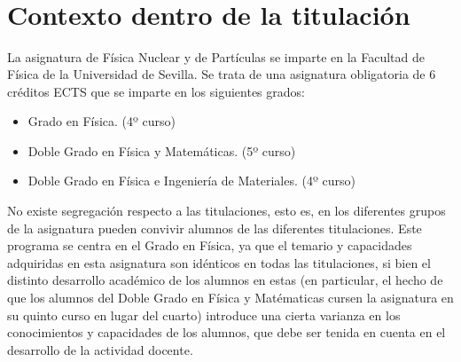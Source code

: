 \documentclass[a4paper,12pt,twoside]{article}
\begin{document}
~ \\

~ \\


\newpage

~ \\
%
%
\newpage

\tableofcontents
\newpage

~ \\




\section{Contexto dentro de la titulación}
\label{intro}

La asignatura de F\'isica Nuclear y de Part\'iculas se imparte en la Facultad de F\'isica de la Universidad de Sevilla. Se trata de una asignatura obligatoria de 6 cr\'editos ECTS que se imparte en los siguientes grados:
\begin{itemize}
\item Grado en F\'isica. (4º curso)
\item Doble Grado en Física y Matemáticas. (5º curso)
\item Doble Grado en Física e Ingeniería de Materiales. (4º curso)
\end{itemize}
No existe segregación respecto a las titulaciones, esto es, en los diferentes grupos de la asignatura pueden convivir alumnos de las diferentes titulaciones. Este programa se centra en el Grado en Física, ya que el temario y capacidades adquiridas en esta asignatura son idénticos en todas las titulaciones, si bien el distinto desarrollo académico de los alumnos en estas (en particular, el hecho de que los alumnos del Doble Grado en Física y Matématicas cursen la asignatura en su quinto curso en lugar del cuarto) introduce una cierta varianza en los conocimientos y capacidades de los alumnos, que debe ser tenida en cuenta en el desarrollo de la actividad docente.
\end{document}
